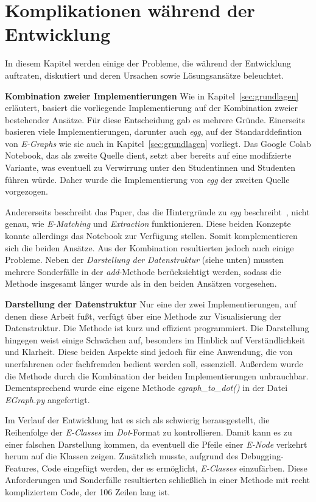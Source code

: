 \section{Komplikationen während der Entwicklung}\label{sec:probleme}

In diesem Kapitel werden einige der Probleme, die während der Entwicklung auftraten, diskutiert und deren Ursachen sowie Lösungsansätze beleuchtet.

\noindent\textbf{Kombination zweier Implementierungen} Wie in Kapitel~\ref{sec:grundlagen} erläutert, basiert die vorliegende Implementierung
auf der Kombination zweier bestehender Ansätze. Für diese Entscheidung gab es mehrere Gründe.
Einerseits basieren viele Implementierungen, darunter auch \textit{egg}, auf der Standarddefintion von \textit{E-Graphs} wie sie auch in Kapitel~\ref{sec:grundlagen} vorliegt.
Das Google Colab Notebook, das als zweite Quelle dient, setzt aber bereits auf eine modifzierte Variante, was eventuell zu Verwirrung unter den Studentinnen und Studenten
führen würde. Daher wurde die Implementierung von \textit{egg} der zweiten Quelle vorgezogen.

Andererseits beschreibt das Paper, das die Hintergründe zu \textit{egg} beschreibt~\cite{2021-egg}, nicht genau, wie \textit{E-Matching} und \textit{Extraction} funktionieren.  
Diese beiden Konzepte konnte allerdings das Notebook zur Verfügung stellen. Somit komplementieren sich die beiden Ansätze.
Aus der Kombination resultierten jedoch auch einige Probleme. Neben der \textit{Darstellung der Datenstruktur} (siehe unten) mussten mehrere Sonderfälle in der \textit{add}-Methode
berücksichtigt werden, sodass die Methode insgesamt länger wurde als in den beiden Ansätzen vorgesehen.

\noindent\textbf{Darstellung der Datenstruktur} Nur eine der zwei Implementierungen, auf denen diese Arbeit fußt, verfügt über eine Methode zur Visualisierung der Datenstruktur.
Die Methode ist kurz und effizient programmiert. Die Darstellung hingegen weist einige Schwächen auf, besonders im Hinblick auf Verständlichkeit und Klarheit.
Diese beiden Aspekte sind jedoch für eine Anwendung, die von unerfahrenen oder fachfremden bedient werden soll, essenziell.
Außerdem wurde die Methode durch die Kombination der beiden Implementierungen unbrauchbar.
Dementsprechend wurde eine eigene Methode \textit{egraph\_to\_dot()} in der Datei \textit{EGraph.py} angefertigt.

Im Verlauf der Entwicklung hat es sich als schwierig herausgestellt, die Reihenfolge der \textit{E-Classes} im \textit{Dot}-Format zu kontrollieren.
Damit kann es zu einer falschen Darstellung kommen, da eventuell die Pfeile einer \textit{E-Node} verkehrt herum auf die Klassen zeigen.
Zusätzlich musste, aufgrund des Debugging-Features, Code eingefügt werden, der es ermöglicht, \textit{E-Classes} einzufärben.
Diese Anforderungen und Sonderfälle resultierten schließlich in einer Methode mit recht kompliziertem Code, der 106 Zeilen lang ist.

